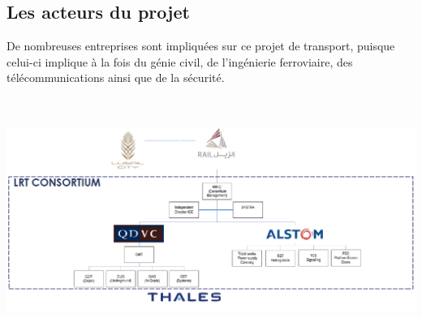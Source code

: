 \subsection{Les acteurs du projet}
De nombreuses entreprises sont impliquées sur ce projet de transport, puisque celui-ci implique à la fois du génie civil, de l'ingénierie ferroviaire, des télécommunications ainsi que de la sécurité.
\begin{center}
\includegraphics[height=8cm]{ressources/images/figures/Consortium.png}
\end{center}

